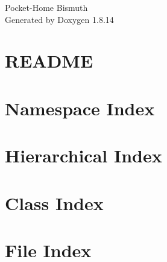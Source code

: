 \documentclass[twoside]{book}
\newcommand{\+}{\discretionary{\mbox{\scriptsize$\hookleftarrow$}}{}{}}
\newcommand{\clearemptydoublepage}{%
  \newpage{\pagestyle{empty}\cleardoublepage}%
}
\begin{document}
\hypersetup{pageanchor=false,
             bookmarksnumbered=true,
             pdfencoding=unicode
            }
\begin{titlepage}
\vspace*{7cm}
\begin{center}%
{\Large Pocket-\/\+Home Bismuth }\\
\vspace*{1cm}
{\large Generated by Doxygen 1.8.14}\\
\end{center}
\end{titlepage}
\clearemptydoublepage
{}
\tableofcontents
\clearemptydoublepage
{}
\hypersetup{pageanchor=true}

\chapter{R\+E\+A\+D\+ME}
\label{md__home_anthony_Workspace_C_09_09_PocketCHIP-pocket-home_README}

\chapter{Namespace Index}

\chapter{Hierarchical Index}

\chapter{Class Index}

\chapter{File Index}

\end{document}
